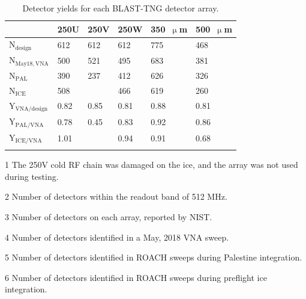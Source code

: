 \begin{table}[!htbp]
  \centering
  \begin{threeparttable}
    \caption[~Detector yields for each BLAST-TNG detector array.]{Detector yields for each BLAST-TNG detector array.}
\begin{tabular}{@{}llllll@{}}
\dtoprule{}
                        & 250U       & 250V \tnote{1} & 250W    &350~$\upmu$m       & 500~$\upmu$m \\ \midrule
N$_{\mathrm{design}}$\tnote{3}   & 612        & 612         & 612        & 775\tnote{2}     & 468     \\
N$_{\mathrm{May18,VNA}}$\tnote{4}& 500        & 521         & 495        & 683              & 381     \\
N$_{\mathrm{PAL}}$ \tnote{5}     & 390        & 237         & 412        & 626              & 326     \\
N$_{\mathrm{ICE}}$ \tnote{6}     & 508        &             & 466        & 619              & 260     \\
Y$_{\mathrm{VNA/design}}$\tnote{7} & 0.82     & 0.85        & 0.81       & 0.88             & 0.81    \\
Y$_{\mathrm{PAL/VNA}}$           & 0.78       & 0.45        & 0.83       & 0.92             & 0.86    \\
Y$_{\mathrm{ICE/VNA}}$           & 1.01       &             & 0.94       & 0.91             & 0.68    \\ \dbottomrule{}
\\
\end{tabular}
\begin{tablenotes}
\item [1] The 250V cold RF chain was damaged on the ice, and the array was not used during testing.
\item [2] Number of detectors within the readout band of 512 MHz.
\item [3] Number of detectors on each array, reported by NIST\@.
\item [4] Number of detectors identified in a May, 2018 VNA sweep.
\item [5] Number of detectors identified in ROACH sweeps during Palestine integration.
\item [6] Number of detectors identified in ROACH sweeps during preflight ice integration.
\vspace{2mm}
\end{tablenotes}
\label{table:det yields}
\end{threeparttable}
\end{table}

